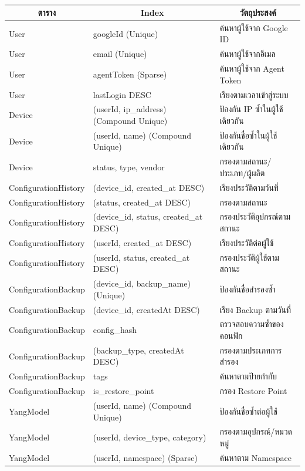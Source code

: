 \begin{table}[H]
    \caption{}
    \label{tab:database-indexes}
    \fontSixTeen 
    \begin{tabularx}{\textwidth}{|l|l|X|} 
        \hline
        \multicolumn{1}{|c|}{\textbf{ตาราง}} & \multicolumn{1}{c|}{\textbf{Index}} & \multicolumn{1}{c|}{\textbf{วัตถุประสงค์}} \\
        \hline
        User & googleId (Unique) & ค้นหาผู้ใช้จาก Google ID \\
        \hline
        User & email (Unique) & ค้นหาผู้ใช้จากอีเมล \\
        \hline
        User & agentToken (Sparse) & ค้นหาผู้ใช้จาก Agent Token \\
        \hline
        User & lastLogin DESC & เรียงตามเวลาเข้าสู่ระบบ \\
        \hline
        Device & (userId, ip\_address) (Compound Unique) & ป้องกัน IP ซ้ำในผู้ใช้เดียวกัน \\
        \hline
        Device & (userId, name) (Compound Unique) & ป้องกันชื่อซ้ำในผู้ใช้เดียวกัน \\
        \hline
        Device & status, type, vendor & กรองตามสถานะ/ประเภท/ผู้ผลิต \\
        \hline
        ConfigurationHistory & (device\_id, created\_at DESC) & เรียงประวัติตามวันที่ \\
        \hline
        ConfigurationHistory & (status, created\_at DESC) & กรองตามสถานะ \\
        \hline
        ConfigurationHistory & (device\_id, status, created\_at DESC) & กรองประวัติอุปกรณ์ตามสถานะ \\
        \hline
        ConfigurationHistory & (userId, created\_at DESC) & เรียงประวัติต่อผู้ใช้ \\
        \hline
        ConfigurationHistory & (userId, status, created\_at DESC) & กรองประวัติผู้ใช้ตามสถานะ \\
        \hline
        ConfigurationBackup & (device\_id, backup\_name) (Unique) & ป้องกันชื่อสำรองซ้ำ \\
        \hline
        ConfigurationBackup & (device\_id, createdAt DESC) & เรียง Backup ตามวันที่ \\
        \hline
        ConfigurationBackup & config\_hash & ตรวจสอบความซ้ำของคอนฟิก \\
        \hline
        ConfigurationBackup & (backup\_type, createdAt DESC) & กรองตามประเภทการสำรอง \\
        \hline
        ConfigurationBackup & tags & ค้นหาตามป้ายกำกับ \\
        \hline
        ConfigurationBackup & is\_restore\_point & กรอง Restore Point \\
        \hline
        YangModel & (userId, name) (Compound Unique) & ป้องกันชื่อซ้ำต่อผู้ใช้ \\
        \hline
        YangModel & (userId, device\_type, category) & กรองตามอุปกรณ์/หมวดหมู่ \\
        \hline
        YangModel & (userId, namespace) (Sparse) & ค้นหาตาม Namespace \\
        \hline
    \end{tabularx}
\end{table}
